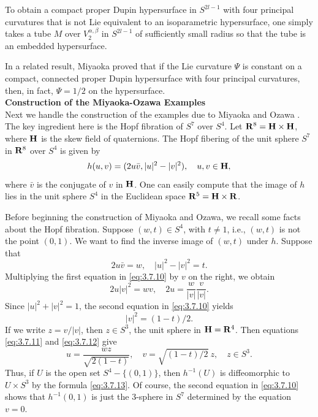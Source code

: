 \documentclass[12pt]{article}
\begin{document}
To obtain a compact proper Dupin hypersurface
in $S^{2l-1}$ with four principal curvatures that is
not Lie equivalent to an isoparametric hypersurface, one simply takes a tube $M$ over 
$V^{\alpha,\beta}_2$ in $S^{2l-1}$ of sufficiently small radius so that the tube is an embedded hypersurface.


In a related result,
Miyaoka \cite[Corollary 8.3, p. 252]{Mi3} proved that if
the Lie curvature $\Psi$ is constant on a compact, connected proper Dupin hypersurface with four principal curvatures,
then, in fact, $\Psi = 1/2$ on the hypersurface.\\

\noindent
{\bf Construction of the Miyaoka-Ozawa Examples}\\

Next we handle the construction of the examples due to Miyaoka and Ozawa
\cite{MO}.  The key ingredient here is the Hopf
fibration of $S^7$ over $S^4$.  Let ${\bf R}^8 = {\bf H} \times {\bf H}$, where ${\bf H}$ is the skew field of
quaternions.  
The Hopf fibering of the unit sphere $S^7$ in ${\bf R}^8$ over $S^4$ is given by
\begin{equation} 
\label{eq:3.7.9}
h(u,v) = (2 u \bar{v}, |u|^2 - |v|^2), \quad u,v \in {\bf H},
\end{equation}
where $\bar{v}$ is the conjugate of $v$ in ${\bf H}$.
One can easily compute that the image of $h$ lies in the unit sphere $S^4$ in the Euclidean space 
${\bf R}^5 = {\bf H} \times {\bf R}$.

Before beginning the construction of Miyaoka and Ozawa, we recall some facts about the Hopf fibration.  Suppose
$(w,t) \in S^4$, with $t \neq 1$, i.e., $(w,t)$ is not the point $(0,1)$.  We want to find the inverse image
of $(w,t)$ under $h$.  Suppose that
\begin{equation} 
\label{eq:3.7.10}
2 u \bar{v} = w, \quad |u|^2 - |v|^2 = t.
\end{equation}
Multiplying the first equation in \eqref{eq:3.7.10} by $v$ on the right, we obtain
\begin{equation} 
\label{eq:3.7.11}
2 u |v|^2 = wv, \quad 2u = \frac{w}{|v|} \frac{v}{|v|}.
\end{equation}
Since $|u|^2 + |v|^2 =1$, the second equation in \eqref{eq:3.7.10} yields
\begin{equation} 
\label{eq:3.7.12}
|v|^2 = (1-t)/2.
\end{equation}
If we write $z = v/|v|$, then $z \in S^3$, the unit sphere in ${\bf H} = {\bf R}^4$.  Then equations \eqref{eq:3.7.11} and
\eqref{eq:3.7.12} give
\begin{equation} 
\label{eq:3.7.13}
u = \frac{wz}{\sqrt{2(1-t)}}, \quad v = \sqrt{(1-t)/2}\  z, \quad z \in S^3.
\end{equation}
Thus, if $U$ is the open set $S^4 - \{(0,1)\}$, then $h^{-1}(U)$ is diffeomorphic to $U \times S^3$ by the formula
\eqref{eq:3.7.13}.  Of course, the second equation in \eqref{eq:3.7.10} shows that $h^{-1}(0,1)$ is just the 3-sphere
in $S^7$ determined by the equation $v=0$.  
\end{document}

